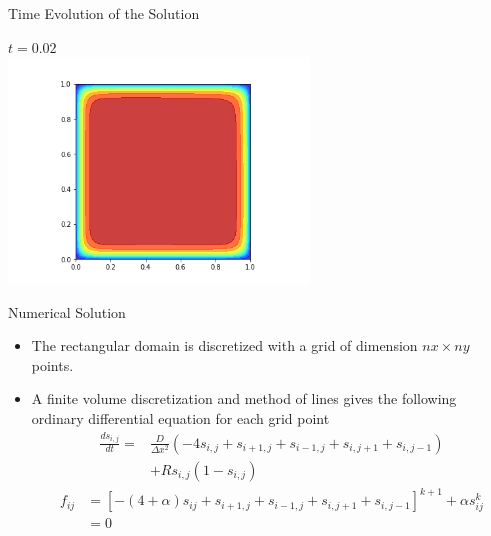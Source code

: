 \documentclass[aspectratio=43]{beamer}
\begin{document}
\begin{frame}[fragile]{Time Evolution of the Solution}
    \begin{center}
        $t=0.02$ \\
        \includegraphics[width=0.6\textwidth]{./image_png/output02.png}
    \end{center}
\end{frame}

\begin{frame}[fragile]{Numerical Solution}
    \begin{itemize}
        \item The rectangular domain is discretized with a grid of  dimension $nx \times ny$ points.
        \item A finite volume discretization and method of lines gives the following ordinary differential equation for each grid point
        \begin{align}
            \frac{ds_{i,j}}{dt} =& \frac{D}{\Delta x^2} \left( -4s_{i,j} + s_{i+1,j}+ s_{i-1,j}+ s_{i,j+1}+ s_{i,j-1} \right) \nonumber\\
            &  + R s_{i,j}(1 - s_{i,j}) \nonumber
        \end{align}
        \begin{align}
            f_{ij} &= \left[ -(4+\alpha)s_{ij} + s_{i+1,j}+ s_{i-1,j}+ s_{i,j+1}+ s_{i,j-1} \right]^{k+1} + \alpha s_{ij}^{k}\nonumber \\
                   &=0 \nonumber
        \end{align}
    \end{itemize}
\end{frame}
\end{document}
